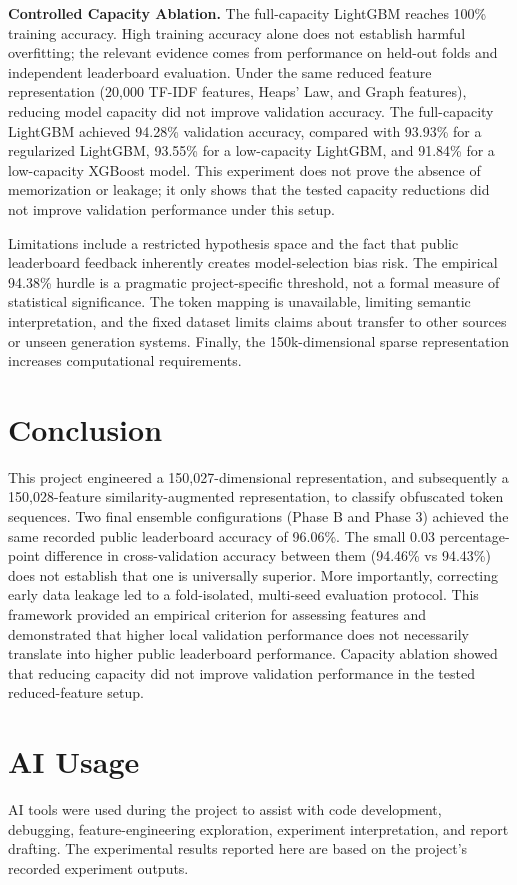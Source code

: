 \documentclass[11pt,a4paper]{article}
\begin{document}
\textbf{Controlled Capacity Ablation.} The full-capacity LightGBM reaches 100\% training accuracy. High training accuracy alone does not establish harmful overfitting; the relevant evidence comes from performance on held-out folds and independent leaderboard evaluation. Under the same reduced feature representation (20,000 TF-IDF features, Heaps' Law, and Graph features), reducing model capacity did not improve validation accuracy. The full-capacity LightGBM achieved 94.28\% validation accuracy, compared with 93.93\% for a regularized LightGBM, 93.55\% for a low-capacity LightGBM, and 91.84\% for a low-capacity XGBoost model. This experiment does not prove the absence of memorization or leakage; it only shows that the tested capacity reductions did not improve validation performance under this setup.

Limitations include a restricted hypothesis space and the fact that public leaderboard feedback inherently creates model-selection bias risk. The empirical 94.38\% hurdle is a pragmatic project-specific threshold, not a formal measure of statistical significance. The token mapping is unavailable, limiting semantic interpretation, and the fixed dataset limits claims about transfer to other sources or unseen generation systems. Finally, the 150k-dimensional sparse representation increases computational requirements.

\section{Conclusion}
This project engineered a 150,027-dimensional representation, and subsequently a 150,028-feature similarity-augmented representation, to classify obfuscated token sequences. Two final ensemble configurations (Phase B and Phase 3) achieved the same recorded public leaderboard accuracy of 96.06\%. The small 0.03 percentage-point difference in cross-validation accuracy between them (94.46\% vs 94.43\%) does not establish that one is universally superior. More importantly, correcting early data leakage led to a fold-isolated, multi-seed evaluation protocol. This framework provided an empirical criterion for assessing features and demonstrated that higher local validation performance does not necessarily translate into higher public leaderboard performance. Capacity ablation showed that reducing capacity did not improve validation performance in the tested reduced-feature setup.

\section*{AI Usage}
AI tools were used during the project to assist with code development, debugging, feature-engineering exploration, experiment interpretation, and report drafting. The experimental results reported here are based on the project's recorded experiment outputs.
\end{document}
